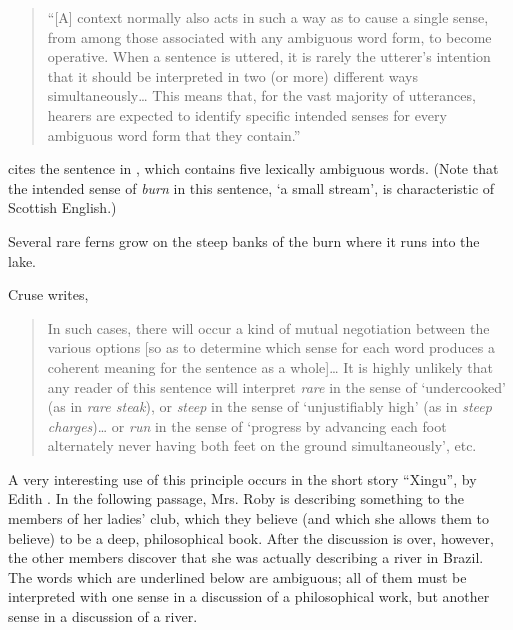 \begin{quote}
“[A] context normally also acts in such a way as to cause a single sense, from among those associated with any ambiguous word form, to become operative. When a sentence is uttered, it is rarely the utterer’s intention that it should be interpreted in two (or more) different ways simultaneously… This means that, for the vast majority of utterances, hearers are expected to identify specific intended senses for every ambiguous word form that they contain.”
\end{quote}


\citet[54]{Cruse1986} cites the sentence in , which contains five lexically ambiguous words. (Note that the intended sense of \textit{burn} in this sentence, ‘a small stream’, is characteristic of Scottish English.)


\ea \label{ex:5.16}
Several rare ferns grow on the steep banks of the burn where it runs into the lake.
\z

Cruse writes,

\begin{quote}
In such cases, there will occur a kind of mutual negotiation between the various options [so as to determine which sense for each word produces a coherent meaning for the sentence as a whole]… It is highly unlikely that any reader of this sentence will interpret \textit{rare} in the sense of ‘undercooked’ (as in \textit{rare steak}), or \textit{steep} in the sense of ‘unjustifiably high’ (as in \textit{steep charges})… or \textit{run} in the sense of ‘progress by advancing each foot alternately never having both feet on the ground simultaneously’, etc.
\end{quote}


A very interesting use of this principle occurs in the short story “Xingu”, by Edith \citet{Wharton1916}. In the following passage, Mrs. Roby is describing something to the members of her ladies’ club, which they believe (and which she allows them to believe) to be a deep, philosophical book. After the discussion is over, however, the other members discover that she was actually describing a river in Brazil. The words which are underlined below are ambiguous; all of them must be interpreted with one sense in a discussion of a philosophical work, but another sense in a discussion of a river.

